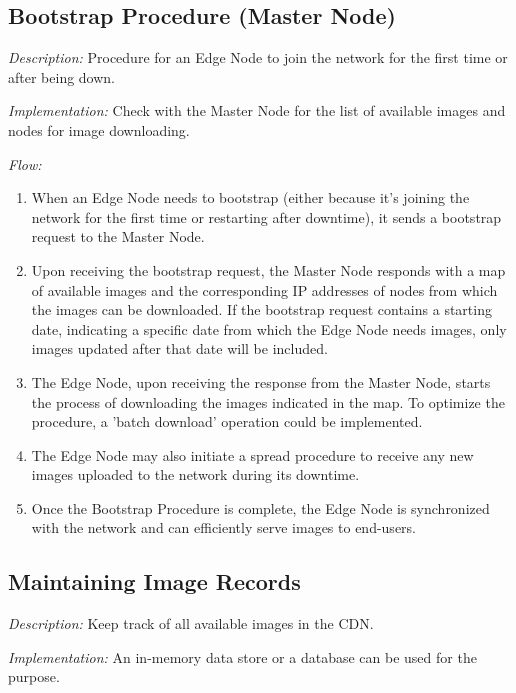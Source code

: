 \documentclass{article}
\begin{document}
  \subsection{Bootstrap Procedure (Master Node)}

  \textit{Description:} Procedure for an Edge Node to join the network for the first time or after being down.

  \textit{Implementation:} Check with the Master Node for the list of available images and nodes for image downloading.

  \textit{Flow:}
  \begin{enumerate}[label=\arabic*.]
    \item When an Edge Node needs to bootstrap (either because it's joining the network for the first time or
    restarting after downtime), it sends a bootstrap request to the Master Node.

    \item Upon receiving the bootstrap request, the Master Node responds with a map of available images and the
    corresponding IP addresses of nodes from which the images can be downloaded. If the bootstrap request
    contains a starting date, indicating a specific date from which the Edge Node needs
    images, only images updated after that date will be included.

    \item The Edge Node, upon receiving the response from the Master Node, starts the process of
    downloading the images indicated in the map.
    To optimize the procedure, a 'batch download' operation could be implemented.

    \item The Edge Node may also initiate a spread procedure to receive any new images uploaded to the
    network during its downtime.

    \item Once the Bootstrap Procedure is complete, the Edge Node is synchronized with the network and can
    efficiently serve images to end-users.
  \end{enumerate}



  \subsection{Maintaining Image Records}

  \textit{Description:} Keep track of all available images in the CDN.

  \textit{Implementation:} An in-memory data store or a database can be used for the purpose.
\end{document}
